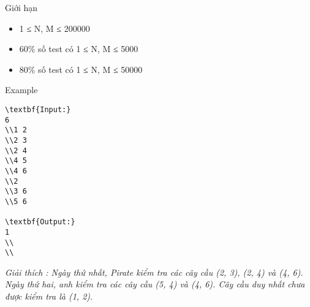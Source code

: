 Giới hạn
\begin{itemize}
	\item     1 ≤ N, M ≤ 200000   
	\item     60\% số test có 1 ≤ N, M ≤ 5000   
	\item     80\% số test có 1 ≤ N, M ≤ 50000   
\end{itemize}
Example
\begin{verbatim}
\textbf{Input:}
6
\\1 2
\\2 3
\\2 4
\\4 5
\\4 6
\\2
\\3 6
\\5 6

\textbf{Output:}
1
\\
\\\end{verbatim}

\emph{     Giải thích        : Ngày thứ nhất, Pirate kiểm tra các cây cầu (2, 3), (2, 4) và (4, 6). Ngày thứ hai, anh kiểm tra các cây cầu (5, 4) và (4, 6). Cây cầu duy nhất chưa được kiểm tra là (1, 2).   }